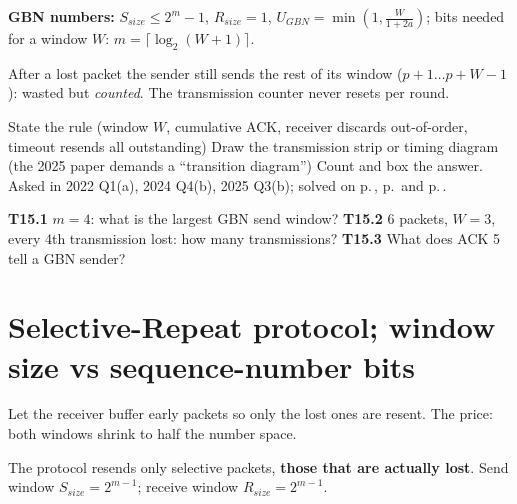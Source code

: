 \textbf{GBN numbers:} $S_{size}\le 2^m-1$, $R_{size}=1$, $U_{GBN}=\min\!\left(1,\frac{W}{1+2a}\right)$; bits needed for a window $W$: $m=\lceil\log_2(W+1)\rceil$.

\begin{warningbox}
After a lost packet the sender still sends the rest of its window ($p+1\ldots p+W-1$): wasted but \emph{counted}. The transmission counter never resets per round.
\end{warningbox}

\begin{answerplan}
 State the rule (window $W$, cumulative ACK, receiver discards out-of-order, timeout resends all outstanding) \quad
{} Draw the transmission strip or timing diagram (the 2025 paper demands a ``transition diagram'') \quad
{} Count and box the answer. Asked in 2022 Q1(a), 2024 Q4(b), 2025 Q3(b); solved on p.\,\pageref{q:MS2022-1a}, p.\,\pageref{q:MS2024-4b} and p.\,\pageref{q:MS2025-3b}.
\par{} \textbf{T15.1} $m=4$: what is the largest GBN send window?\quad
\textbf{T15.2} 6 packets, $W=3$, every 4th transmission lost: how many transmissions?\quad
\textbf{T15.3} What does ACK 5 tell a GBN sender?
\end{answerplan}

\section{Selective-Repeat protocol; window size vs sequence-number bits}\label{sec:T16}
  

\begin{intuitionbox}
Let the receiver buffer early packets so only the lost ones are resent. The price: both windows shrink to half the number space.
\end{intuitionbox}

\begin{definitionbox}
The  protocol resends only selective packets, \textbf{those that are actually lost}.
Send window $S_{size}=2^{m-1}$; receive window $R_{size}=2^{m-1}$. 
\end{definitionbox}

